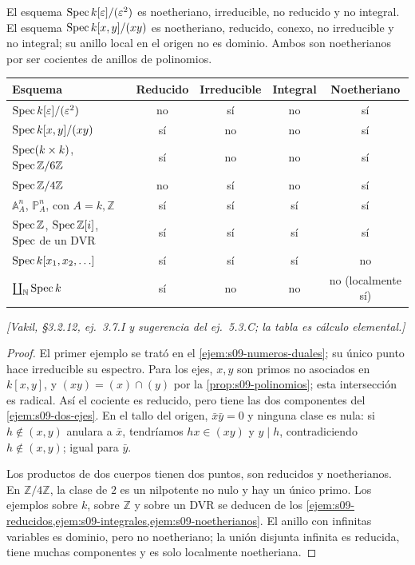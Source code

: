 \begin{ejem}
\label{ejem:s09-tabla-propiedades}
El esquema $\operatorname{Spec} k[\varepsilon]/(\varepsilon^2)$ es noetheriano, irreducible, no reducido y no integral. El esquema $\operatorname{Spec} k[x,y]/(xy)$ es noetheriano, reducido, conexo, no irreducible y no integral; su anillo local en el origen no es dominio. Ambos son noetherianos por ser cocientes de anillos de polinomios.
\begin{center}
\footnotesize
\setlength{\tabcolsep}{4pt}
\renewcommand{\arraystretch}{1.25}
\begin{tabular}{lcccc}
\hline
Esquema & Reducido & Irreducible & Integral & Noetheriano\\
\hline
$\operatorname{Spec} k[\varepsilon]/(\varepsilon^2)$ & no & sí & no & sí\\
$\operatorname{Spec} k[x,y]/(xy)$ & sí & no & no & sí\\
$\operatorname{Spec}(k\times k)$, $\operatorname{Spec}\mathbb Z/6\mathbb Z$ & sí & no & no & sí\\
$\operatorname{Spec}\mathbb Z/4\mathbb Z$ & no & sí & no & sí\\
$\mathbb A^n_A$, $\mathbb P^n_A$, con $A=k,\mathbb Z$ & sí & sí & sí & sí\\
$\operatorname{Spec}\mathbb Z$, $\operatorname{Spec}\mathbb Z[i]$, $\operatorname{Spec}$ de un DVR & sí & sí & sí & sí\\
$\operatorname{Spec} k[x_1,x_2,\ldots]$ & sí & sí & sí & no\\
$\coprod_{\mathbb N}\operatorname{Spec} k$ & sí & no & no & no (localmente sí)\\
\hline
\end{tabular}
\end{center}
\emph{[Vakil, \S3.2.12, ej.~3.7.I y sugerencia del ej.~5.3.C; la tabla es cálculo elemental.]}
\end{ejem}
\begin{proof}
El primer ejemplo se trató en el \cref{ejem:s09-numeros-duales}; su único punto hace irreducible su espectro. Para los ejes, $x,y$ son primos no asociados en $k[x,y]$, y $(xy)=(x)\cap(y)$ por la \cref{prop:s09-polinomios}; esta intersección es radical. Así el cociente es reducido, pero tiene las dos componentes del \cref{ejem:s09-dos-ejes}. En el tallo del origen, $\bar x\bar y=0$ y ninguna clase es nula: si $h\notin(x,y)$ anulara a $\bar x$, tendríamos $hx\in(xy)$ y $y\mid h$, contradiciendo $h\notin(x,y)$; igual para $\bar y$.

Los productos de dos cuerpos tienen dos puntos, son reducidos y noetherianos. En $\mathbb Z/4\mathbb Z$, la clase de $2$ es un nilpotente no nulo y hay un único primo. Los ejemplos sobre $k$, sobre $\mathbb Z$ y sobre un DVR se deducen de los \cref{ejem:s09-reducidos,ejem:s09-integrales,ejem:s09-noetherianos}. El anillo con infinitas variables es dominio, pero no noetheriano; la unión disjunta infinita es reducida, tiene muchas componentes y es solo localmente noetheriana.
\end{proof}

